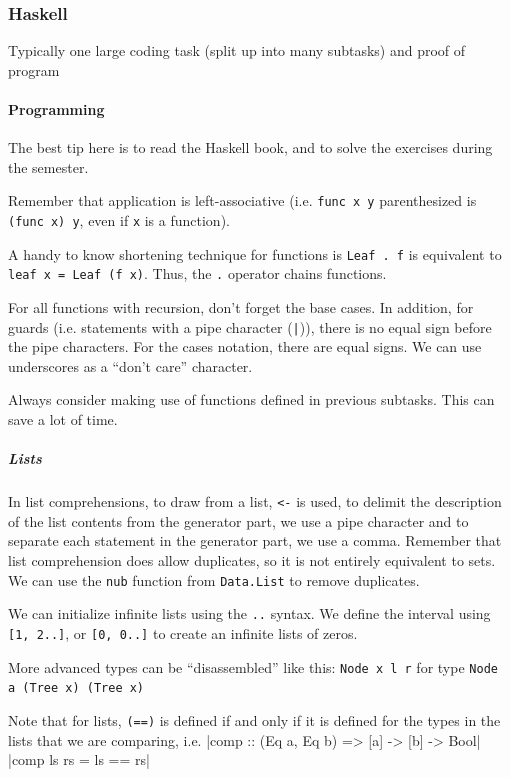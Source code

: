 \subsubsection{Haskell}
\begin{examdetails}
    Typically one large coding task (split up into many subtasks) and proof of program
\end{examdetails}

\paragraph{Programming}
The best tip here is to read the Haskell book, and to solve the exercises during the semester.

Remember that application is left-associative (i.e. \texttt{func x y} parenthesized is \texttt{(func x) y}, even if \texttt{x} is a function).

A handy to know shortening technique for functions is \texttt{Leaf . f} is equivalent to \texttt{leaf x = Leaf (f x)}.
Thus, the \texttt{.} operator chains functions.

For all functions with recursion, don't forget the base cases. In addition, for guards (i.e. statements with a pipe character (\texttt{|})),
there is no equal sign before the pipe characters.
For the cases notation, there are equal signs. We can use underscores as a ``don't care'' character.

Always consider making use of functions defined in previous subtasks. This can save a lot of time.

\subparagraph{Lists}
In list comprehensions, to draw from a list, \texttt{<-} is used, to delimit the description of the list contents from the generator part, we use a pipe character
and to separate each statement in the generator part, we use a comma.
Remember that list comprehension does allow duplicates, so it is not entirely equivalent to sets.
We can use the \texttt{nub} function from \texttt{Data.List} to remove duplicates.

We can initialize infinite lists using the \texttt{..} syntax. We define the interval using \texttt{[1, 2..]}, or \texttt{[0, 0..]} to create an infinite lists of zeros.

More advanced types can be ``disassembled'' like this: \texttt{Node x l r} for type \texttt{Node a (Tree x) (Tree x)}

Note that for lists, \texttt{(==)} is defined if and only if it is defined for the types in the lists that we are comparing, i.e.
|comp :: (Eq a, Eq b) => [a] -> [b] -> Bool|
|comp ls rs = ls == rs|


